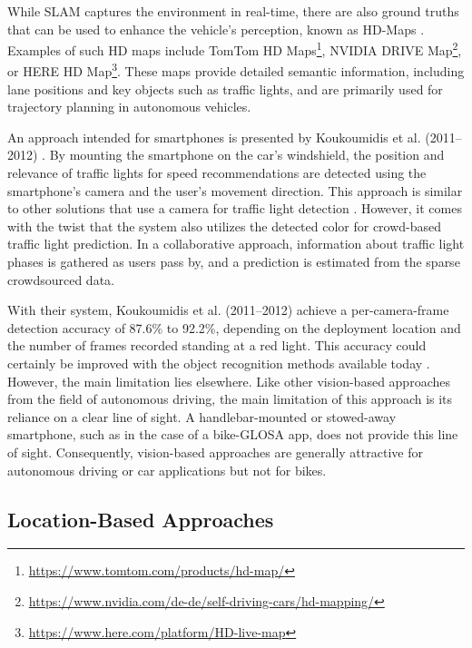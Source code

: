 While SLAM captures the environment in real-time, there are also ground truths that can be used to enhance the vehicle's perception, known as HD-Maps \cite{kang_lane-level_2020}. Examples of such HD maps include TomTom HD Maps\footnote{\url{https://www.tomtom.com/products/hd-map/}}, NVIDIA DRIVE Map\footnote{\url{https://www.nvidia.com/de-de/self-driving-cars/hd-mapping/}}, or HERE HD Map\footnote{\url{https://www.here.com/platform/HD-live-map}}. These maps provide detailed semantic information, including lane positions and key objects such as traffic lights, and are primarily used for trajectory planning in autonomous vehicles.

An approach intended for smartphones is presented by Koukoumidis et al. (2011–2012) \cite{koukoumidis_signalguru_2011, koukoumidis_leveraging_2012}. By mounting the smartphone on the car's windshield, the position and relevance of traffic lights for speed recommendations are detected using the smartphone's camera and the user's movement direction. This approach is similar to other solutions that use a camera for traffic light detection \cite{yoneda_robust_2020}. However, it comes with the twist that the system also utilizes the detected color for crowd-based traffic light prediction. In a collaborative approach, information about traffic light phases is gathered as users pass by, and a prediction is estimated from the sparse crowdsourced data. 

With their system, Koukoumidis et al. (2011–2012) \cite{koukoumidis_signalguru_2011, koukoumidis_leveraging_2012} achieve a per-camera-frame detection accuracy of 87.6\% to 92.2\%, depending on the deployment location and the number of frames recorded standing at a red light. This accuracy could certainly be improved with the object recognition methods available today \cite{boukerche_object_2021}. However, the main limitation lies elsewhere. Like other vision-based approaches from the field of autonomous driving, the main limitation of this approach is its reliance on a clear line of sight. A handlebar-mounted or stowed-away smartphone, such as in the case of a bike-GLOSA app, does not provide this line of sight. Consequently, vision-based approaches are generally attractive for autonomous driving or car applications but not for bikes.

\subsection{Location-Based Approaches}

